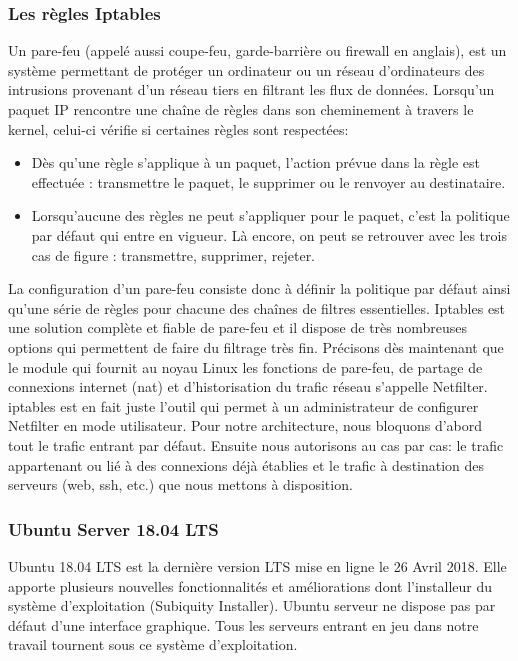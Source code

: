 	  \subsubsection{Les r\`egles Iptables}	  
	      Un pare-feu (appelé aussi coupe-feu, garde-barrière ou firewall en anglais), est un système permettant de protéger un ordinateur ou un réseau d'ordinateurs des intrusions provenant d'un réseau tiers en filtrant les flux de donn\'ees. Lorsqu’un paquet IP rencontre une chaîne de règles dans son cheminement à travers le kernel, celui-ci vérifie si certaines r\`egles sont respect\'ees:
	      \begin{itemize}
		  \item Dès qu’une règle s’applique à un paquet, l’action prévue dans la règle est effectuée : transmettre le paquet, le supprimer ou le renvoyer au destinataire.
		  \item Lorsqu’aucune des règles ne peut s’appliquer pour le paquet, c’est la politique par défaut qui entre en vigueur. Là encore, on peut se retrouver avec les trois cas de figure : transmettre, supprimer, rejeter.
	      \end{itemize}
	  La configuration d’un pare-feu consiste donc à définir la politique par défaut ainsi qu’une série de règles pour chacune des chaînes de filtres essentielles\cite{iptables}.
	  Iptables est une solution complète et fiable de pare-feu et il dispose de très nombreuses options qui permettent de faire du filtrage très fin. Précisons dès maintenant que le module qui fournit au noyau Linux les fonctions de pare-feu, de partage de connexions internet (\gls{nat}) et d'historisation du trafic réseau s'appelle Netfilter. iptables est en fait juste l'outil qui permet à un administrateur de configurer Netfilter en mode utilisateur. Pour notre architecture, nous bloquons d'abord tout le trafic entrant par défaut. Ensuite nous autorisons au cas par cas: le trafic appartenant ou lié à des connexions déjà établies et le trafic à destination des serveurs (web, ssh, etc.) que nous mettons à disposition.
	  
	  
	  \subsubsection{Ubuntu Server 18.04 LTS}
	    Ubuntu 18.04 LTS est la derni\`ere version LTS mise en ligne le 26 Avril 2018. Elle apporte plusieurs nouvelles fonctionnalités et améliorations dont l'installeur du syst\`eme d'exploitation (Subiquity Installer). Ubuntu serveur ne dispose pas par d\'efaut d'une interface graphique. Tous les serveurs entrant en jeu dans notre travail tournent sous ce syst\`eme d'exploitation.

